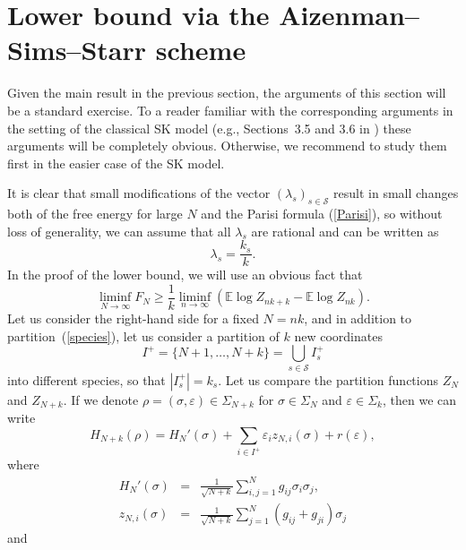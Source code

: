 \documentclass[aop,MSNbibl,dvips]{arximspdf}
\def\cal{\mathscr}
\newcommand{\spe}{{\cal S}}
\newcommand{\eps}{{\varepsilon}}
\newcommand{\e}{\mathbb{E}}
\begin{document}
\section{Lower bound via the Aizenman--Sims--Starr scheme}\label{Sec5label}

Given the main result in the previous section, the arguments of this
section will be a standard exercise. To a reader familiar with the
corresponding arguments in the setting of the classical SK model (e.g.,
Sections~3.5 and 3.6 in \cite{SKmodel}) these arguments will be
completely obvious. Otherwise, we recommend to study them first in the
easier case of the SK model.

It is clear that small modifications of the vector $(\lambda_s)_{s\in
\spe}$ result in small changes both of the free energy for large $N$
and the Parisi formula (\ref{Parisi}), so without loss of generality,
we can assume that all $\lambda_s$ are rational and can be written as
%
\begin{equation}
\lambda_s = \frac{k_s}{k}.
\end{equation}
%
In the proof of the lower bound, we will use an obvious fact that
%
\begin{equation}
\liminf_{N\to\infty} F_N \geq\frac{1}{k}\liminf
_{n\to\infty} (\e \log Z_{nk+k} - \e\log Z_{nk} ).
\label{FNAN}
\end{equation}
%
Let us consider the right-hand side for a fixed $N=nk$, and in addition
to partition~(\ref{species}), let us consider a partition of $k$ new
coordinates
%
\begin{equation}
I^+ = \{N+1,\ldots, N+k\} = \bigcup_{s\in\spe}
I_s^+ \label{speciescavity}
\end{equation}
%
into different species, so that $|I_s^+| = k_s$. Let us compare the
partition functions $Z_{N}$ and $Z_{N+k}$. If we denote $\rho= (\sigma
,\eps)\in\Sigma_{N+k}$ for $\sigma\in\Sigma_N$ and $\eps
\in\Sigma
_k$, then we can write
%
\begin{equation}
H_{N+k}(\rho) = H_N'(\sigma) + \sum
_{i\in I^+}\eps_i z_{N,i}(\sigma ) + r(
\eps), \label{decomp1}
\end{equation}
%
where
%
\begin{eqnarray}
H_N'(\sigma)& = &\frac{1}{\sqrt{N+k}} \sum
_{i,j =1}^N g_{ij}\sigma_i
\sigma_j, \label{commonH}
\\
z_{N,i}(\sigma) &=& \frac{1}{\sqrt{N+k}} \sum
_{j=1}^N (g_{ij} + g_{ji} )
\sigma_j
\end{eqnarray}
%
and
%
\end{document}
